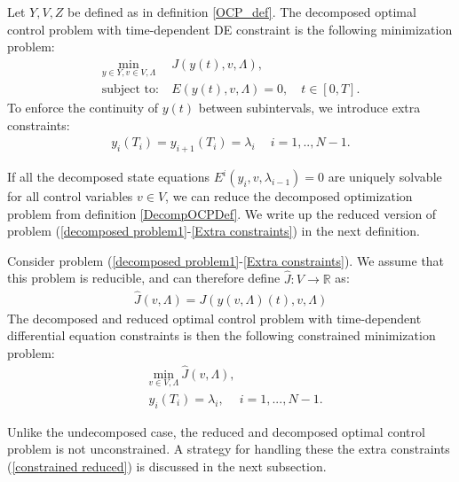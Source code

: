 \begin{definition} \label{DecompOCPDef}
Let $Y,V,Z$ be defined as in definition \ref{OCP_def}. The decomposed optimal control problem with time-dependent DE constraint is the following minimization problem:
\begin{align}
\underset{y\in Y,v\in V,\Lambda}{\text{min}} \ &J(y(t),v,\Lambda),  \label{decomposed problem1}\\
\textrm{subject to:} \ &E(y(t),v,\Lambda)=0, \quad t\in [0,T]. \label{decomposed problem}
\end{align}
To enforce the continuity of $y(t)$ between subintervals, we introduce extra constraints:
 \begin{align}
y_{i}(T_i)=y_{i+1}(T_i)=\lambda_i \quad \ i=1,..,N-1. \label{Extra constraints}
\end{align}
\end{definition}
\noindent
If all the decomposed state equations $E^i(y_i,v,\lambda_{i-1})=0$ are uniquely solvable for all control variables $v\in V$, we can reduce the decomposed optimization problem from definition \ref{DecompOCPDef}. We write up the reduced version of problem (\ref{decomposed problem1}-\ref{Extra constraints}) in the next definition.
\begin{definition} \label{DecompRedOCPDef}
Consider problem (\ref{decomposed problem1}-\ref{Extra constraints}). We assume that this problem is reducible, and can therefore define $\hat J:V\rightarrow\mathbb{R}$ as:
\begin{align*}
\hat J(v,\Lambda) = J(y(v,\Lambda)(t),v,\Lambda)
\end{align*}
The decomposed and reduced optimal control problem with time-dependent differential equation constraints is then the following constrained minimization problem:
\begin{align}
&\underset{v\in V,\Lambda}{\text{min}} \ \hat J(v,\Lambda), \label{constrained reduced j}\\
&y_{i}(T_i)=\lambda_i, \ \quad  i=1,...,N-1. \label{constrained reduced}
\end{align}
\end{definition}
\noindent
Unlike the undecomposed case, the reduced and decomposed optimal control problem is not unconstrained. A strategy for handling these the extra constraints (\ref{constrained reduced}) is discussed in the next subsection.
